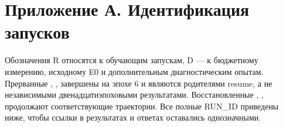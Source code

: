 \clearpage
\section*{Приложение А. Идентификация запусков}
Обозначения R относятся к обучающим запускам, D --- к бюджетному измерению, исходному E0 и дополнительным диагностическим опытам. Прерванные , ,  завершены на эпохе 6 и являются родителями resume, а не независимыми двенадцатиэпоховыми результатами. Восстановленные , ,  продолжают соответствующие траектории. Все полные RUN\_ID приведены ниже, чтобы ссылки в результатах и ответах оставались однозначными.
\begingroup\small{}\setlength{\tabcolsep}{3pt}\endgroup
